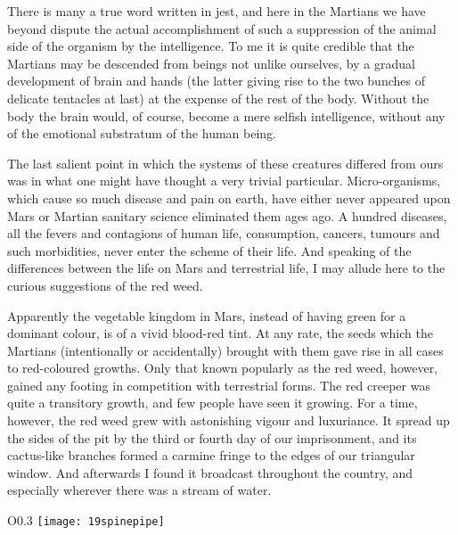 There is many a true word written in jest, and here in the Martians we have beyond dispute the actual accomplishment of such a suppression of the animal side of the organism by the intelligence. To me it is quite credible that the Martians may be descended from beings not unlike ourselves, by a gradual development of brain and hands (the latter giving rise to the two bunches of delicate tentacles at last) at the expense of the rest of the body. Without the body the brain would, of course, become a mere selfish intelligence, without any of the emotional substratum of the human being.

The last salient point in which the systems of these creatures differed from ours was in what one might have thought a very trivial particular. Micro-organisms, which cause so much disease and pain on earth, have either never appeared upon Mars or Martian sanitary science eliminated them ages ago. A hundred diseases, all the fevers and contagions of human life, consumption, cancers, tumours and such morbidities, never enter the scheme of their life. And speaking of the differences between the life on Mars and terrestrial life, I may allude here to the curious suggestions of the red weed.

Apparently the vegetable kingdom in Mars, instead of having green for a dominant colour, is of a vivid blood-red tint. At any rate, the seeds which the Martians (intentionally or accidentally) brought with them gave rise in all cases to red-coloured growths. Only that known popularly as the red weed, however, gained any footing in competition with terrestrial forms. The red creeper was quite a transitory growth, and few people have seen it growing. For a time, however, the red weed grew with astonishing vigour and luxuriance. It spread up the sides of the pit by the third or fourth day of our imprisonment, and its cactus-like branches formed a carmine fringe to the edges of our triangular window. And afterwards I found it broadcast throughout the country, and especially wherever there was a stream of water.

\begin{wrapfigure}{O}{0.3\textwidth}
\centering
\texttt{[image: 19spinepipe]}
\end{wrapfigure}

